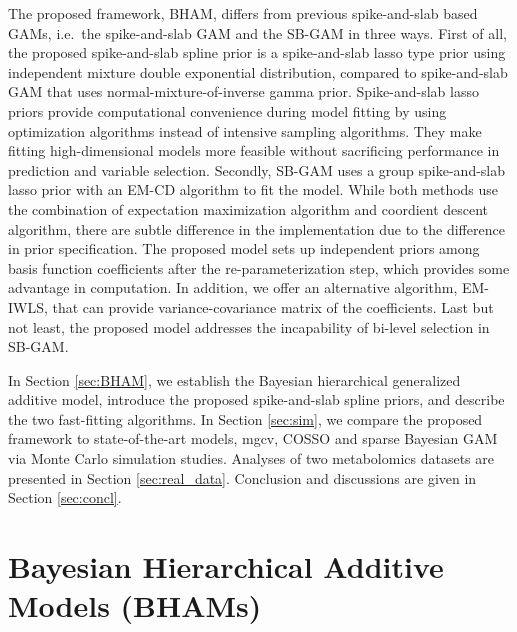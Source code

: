 \documentclass[AMA,STIX1COL,]{WileyNJD-v2}
\begin{document}
The proposed framework, BHAM, differs from previous spike-and-slab based
GAMs, i.e.~the spike-and-slab GAM \citep{Scheipl2012} and the SB-GAM
\citep{Bai2021} in three ways. First of all, the proposed spike-and-slab
spline prior is a spike-and-slab lasso type prior using independent
mixture double exponential distribution, compared to spike-and-slab GAM
that uses normal-mixture-of-inverse gamma prior. Spike-and-slab lasso
priors provide computational convenience during model fitting by using
optimization algorithms instead of intensive sampling algorithms. They
make fitting high-dimensional models more feasible without sacrificing
performance in prediction and variable selection. Secondly, SB-GAM uses
a group spike-and-slab lasso prior with an EM-CD algorithm to fit the
model. While both methods use the combination of expectation
maximization algorithm and coordient descent algorithm, there are subtle
difference in the implementation due to the difference in prior
specification. The proposed model sets up independent priors among basis
function coefficients after the re-parameterization step, which provides
some advantage in computation. In addition, we offer an alternative
algorithm, EM-IWLS, that can provide variance-covariance matrix of the
coefficients. Last but not least, the proposed model addresses the
incapability of bi-level selection in SB-GAM.

In Section \ref{sec:BHAM}, we establish the Bayesian hierarchical
generalized additive model, introduce the proposed spike-and-slab spline
priors, and describe the two fast-fitting algorithms. In Section
\ref{sec:sim}, we compare the proposed framework to state-of-the-art
models, mgcv, COSSO and sparse Bayesian GAM via Monte Carlo simulation
studies. Analyses of two metabolomics datasets are presented in Section
\ref{sec:real_data}. Conclusion and discussions are given in Section
\ref{sec:concl}.

\hypertarget{bayesian-hierarchical-additive-models-bhams}{%
\section{Bayesian Hierarchical Additive Models
(BHAMs)}\label{bayesian-hierarchical-additive-models-bhams}}

\label{sec:BHAM}
\end{document}

